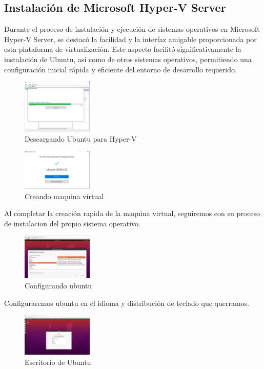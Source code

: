\documentclass[journal]{IEEEtran}
\begin{document}
\subsection{Instalación de Microsoft Hyper-V Server}
Durante el proceso de instalación y ejecución de sistemas operativos en Microsoft Hyper-V Server, se destacó la facilidad y la interfaz amigable proporcionada por esta plataforma de virtualización. Este aspecto facilitó significativamente la instalación de Ubuntu, así como de otros sistemas operativos, permitiendo una configuración inicial rápida y eficiente del entorno de desarrollo requerido.\\
\begin{figure}[htbp]
  \centering
  \includegraphics[width=0.3\textwidth]{enyel1.jpg}
  \caption{Descargando Ubuntu para Hyper-V}
\end{figure}
\begin{figure}[htbp]
  \centering
  \includegraphics[width=0.3\textwidth]{enyel5.jpg}
  \caption{Creando maquina virtual}
\end{figure}
Al completar la creación rapida de la maquina virtual, seguiremos con su proceso de instalacion del propio sistema operativo.

\begin{figure}[htbp]
  \centering
  \includegraphics[width=0.3\textwidth]{enyel7.jpg}
  \caption{Configurando ubuntu}
\end{figure}
 Configuraremos ubuntu en el idioma y distribución de teclado que querramos.
\begin{figure}[htbp]
  \centering
  \includegraphics[width=0.3\textwidth]{enyel2.jpg}
  \caption{Escritorio de Ubuntu}
\end{figure}
\end{document}
